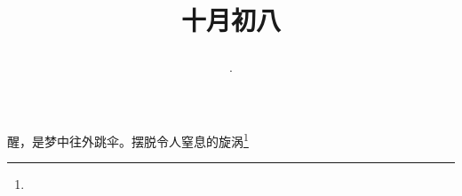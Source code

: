 \title{\date[d=8,m=11,y=2024][year:cn-y,年,month:cn,day:cn,日,·,weekday]·十月初八 }
醒，是梦中往外跳伞。摆脱令人窒息的旋涡\footnote{ }


